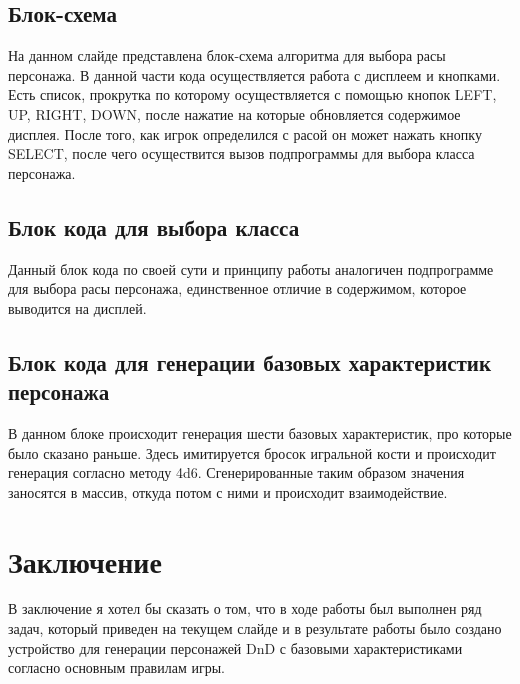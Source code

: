 \documentclass[12pt,a4paper]{article}
\begin{document}
\subsection{Блок-схема}

На данном слайде представлена блок-схема алгоритма для выбора расы персонажа. В данной части кода осуществляется работа с дисплеем и кнопками. Есть список, прокрутка по которому осуществляется с помощью кнопок LEFT, UP, RIGHT, DOWN, после нажатие на которые обновляется содержимое дисплея. После того, как игрок определился с расой он может нажать кнопку SELECT, после чего осуществится вызов подпрограммы для выбора класса персонажа.

\subsection{Блок кода для выбора класса}

Данный блок кода по своей сути и принципу работы аналогичен подпрограмме для выбора расы персонажа, единственное отличие в содержимом, которое выводится на дисплей.

\subsection{Блок кода для генерации базовых характеристик персонажа}

В данном блоке происходит генерация шести базовых характеристик, про которые было сказано раньше. Здесь имитируется бросок игральной кости и происходит генерация согласно методу 4d6. Сгенерированные таким образом значения заносятся в массив, откуда потом с ними и происходит взаимодействие.

\section{Заключение}

В заключение я хотел бы сказать о том, что в ходе работы был выполнен ряд задач, который приведен на текущем слайде и в результате работы было создано устройство для генерации персонажей DnD с базовыми характеристиками согласно основным правилам игры.
\end{document}
